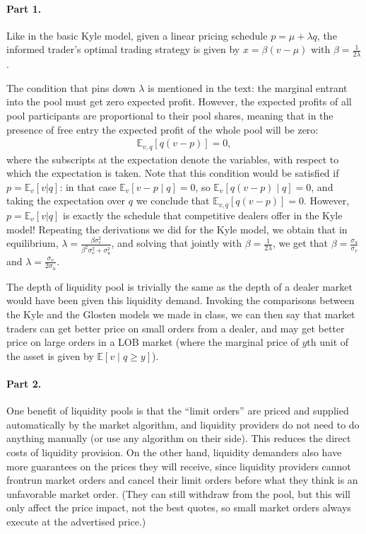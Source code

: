 \begin{solution}
	\paragraph{Part 1.}
	Like in the basic Kyle model, given a linear pricing schedule $p = \mu + \lambda q$, the informed trader's optimal trading strategy is given by $x = \beta (v-\mu)$ with $\beta = \frac{1}{2\lambda}$.
	
	The condition that pins down $\lambda$ is mentioned in the text: the marginal entrant into the pool must get zero expected profit. However, the expected profits of all pool participants are proportional to their pool shares, meaning that in the presence of free entry the expected profit of the whole pool will be zero:
	\begin{align*}
		\mathbb{E}_{v,q} \left[ q (v - p) \right] = 0,
	\end{align*}
	where the subscripts at the expectation denote the variables, with respect to which the expectation is taken.
	Note that this condition would be satisfied if $p = \mathbb{E}_v[v|q]$: in that case $\mathbb{E}_v[v-p \mid q]=0$, so $\mathbb{E}_v[q(v-p) \mid q] = 0$, and taking the expectation over $q$ we conclude that $\mathbb{E}_{v,q} \left[ q (v - p) \right] = 0$.
	However, $p = \mathbb{E}_v[v|q]$ is exactly the schedule that competitive dealers offer in the Kyle model! Repeating the derivations we did for the Kyle model, we obtain that in equilibrium, $\lambda = \frac{\beta \sigma^2_v}{\beta^2 \sigma^2_v + \sigma^2_u}$, and solving that jointly with $\beta = \frac{1}{2\lambda}$, we get that $\beta = \frac{\sigma_u}{\sigma_v}$ and $\lambda = \frac{\sigma_v}{2\sigma_u}$.
	
	The depth of liquidity pool is trivially the same as the depth of a dealer market would have been given this liquidity demand. Invoking the comparisons between the Kyle and the Glosten models we made in class, we can then say that market traders can get better price on small orders from a dealer, and may get better price on large orders in a LOB market (where the marginal price of $y$th unit of the asset is given by $\mathbb{E}[v \mid q \geq y]$).
	
	\paragraph{Part 2.}
	One benefit of liquidity pools is that the ``limit orders'' are priced and supplied automatically by the market algorithm, and liquidity providers do not need to do anything manually (or use any algorithm on their side). This reduces the direct costs of liquidity provision. On the other hand, liquidity demanders also have more guarantees on the prices they will receive, since liquidity providers cannot frontrun market orders and cancel their limit orders before what they think is an unfavorable market order. (They can still withdraw from the pool, but this will only affect the price impact, not the best quotes, so small market orders always execute at the advertised price.)
	

\end{solution}
